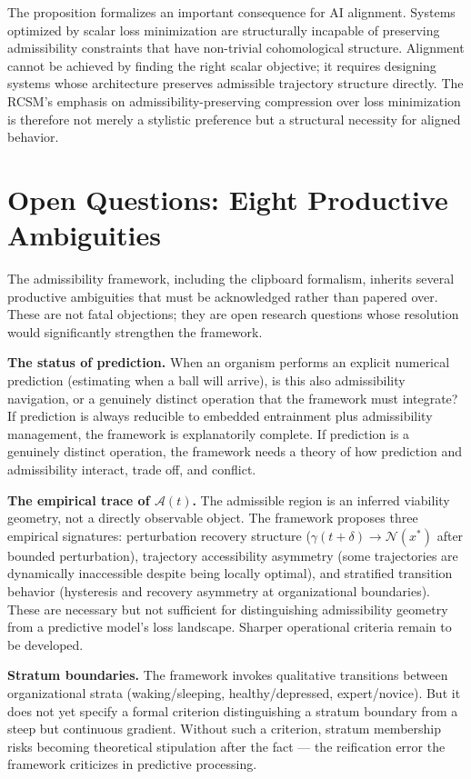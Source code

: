\documentclass[12pt,oneside]{book}
\theoremstyle{plain}
\theoremstyle{definition}
\theoremstyle{plain}
\begin{document}
The proposition formalizes an important consequence for AI alignment. Systems optimized by scalar loss minimization are structurally incapable of preserving admissibility constraints that have non-trivial cohomological structure. Alignment cannot be achieved by finding the right scalar objective; it requires designing systems whose architecture preserves admissible trajectory structure directly. The RCSM's emphasis on admissibility-preserving compression over loss minimization is therefore not merely a stylistic preference but a structural necessity for aligned behavior.

\section{Open Questions: Eight Productive Ambiguities}

The admissibility framework, including the clipboard formalism, inherits several productive ambiguities that must be acknowledged rather than papered over. These are not fatal objections; they are open research questions whose resolution would significantly strengthen the framework.

\textbf{The status of prediction.} When an organism performs an explicit numerical prediction (estimating when a ball will arrive), is this also admissibility navigation, or a genuinely distinct operation that the framework must integrate? If prediction is always reducible to embedded entrainment plus admissibility management, the framework is explanatorily complete. If prediction is a genuinely distinct operation, the framework needs a theory of how prediction and admissibility interact, trade off, and conflict.

\textbf{The empirical trace of $\mathcal{A}(t)$.} The admissible region is an inferred viability geometry, not a directly observable object. The framework proposes three empirical signatures: perturbation recovery structure ($\gamma(t+\delta) \to \mathcal{N}(x^*)$ after bounded perturbation), trajectory accessibility asymmetry (some trajectories are dynamically inaccessible despite being locally optimal), and stratified transition behavior (hysteresis and recovery asymmetry at organizational boundaries). These are necessary but not sufficient for distinguishing admissibility geometry from a predictive model's loss landscape. Sharper operational criteria remain to be developed.

\textbf{Stratum boundaries.} The framework invokes qualitative transitions between organizational strata (waking/sleeping, healthy/depressed, expert/novice). But it does not yet specify a formal criterion distinguishing a stratum boundary from a steep but continuous gradient. Without such a criterion, stratum membership risks becoming theoretical stipulation after the fact — the reification error the framework criticizes in predictive processing.
\end{document}
